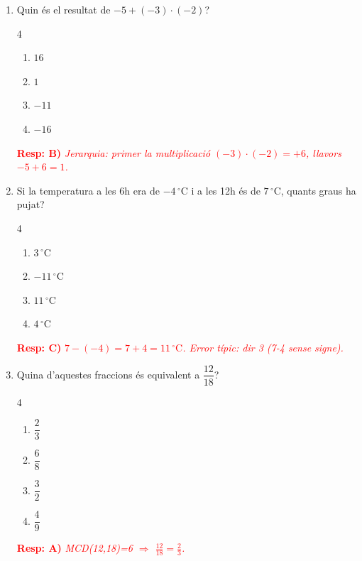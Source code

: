 \documentclass[a4paper, 11pt]{article}
\begin{document}
\begin{enumerate}[label=\textbf{\arabic*.}, itemsep=0.8em]

    \item Quin és el resultat de $-5 + (-3) \cdot (-2)$?
    \begin{multicols}{4}
    \begin{enumerate}[label=\textbf{\Alph*)}, itemsep=0.3em]
        \item $16$ \item $1$ \item $-11$ \item $-16$
    \end{enumerate}
    \end{multicols}
    \textcolor{red}{\textbf{Resp: B)} \textit{Jerarquia: primer la multiplicació $(-3)\cdot(-2)=+6$, llavors $-5+6=1$.}}

    \item Si la temperatura a les 6h era de $-4\,^{\circ}\text{C}$ i a les 12h és de $7\,^{\circ}\text{C}$, quants graus ha pujat?
    \begin{multicols}{4}
    \begin{enumerate}[label=\textbf{\Alph*)}, itemsep=0.3em]
        \item $3\,^{\circ}\text{C}$ \item $-11\,^{\circ}\text{C}$ \item $11\,^{\circ}\text{C}$ \item $4\,^{\circ}\text{C}$
    \end{enumerate}
    \end{multicols}
    \textcolor{red}{\textbf{Resp: C)} \textit{$7 - (-4) = 7 + 4 = 11\,^{\circ}\text{C}$. Error típic: dir 3 (7-4 sense signe).}}

    \item Quina d'aquestes fraccions és equivalent a $\dfrac{12}{18}$?
    \begin{multicols}{4}
    \begin{enumerate}[label=\textbf{\Alph*)}, itemsep=0.3em]
        \item $\dfrac{2}{3}$ \item $\dfrac{6}{8}$ \item $\dfrac{3}{2}$ \item $\dfrac{4}{9}$
    \end{enumerate}
    \end{multicols}
    \textcolor{red}{\textbf{Resp: A)} \textit{MCD(12,18)=6 $\Rightarrow$ $\frac{12}{18}=\frac{2}{3}$.}}


\end{enumerate}
\end{document}

